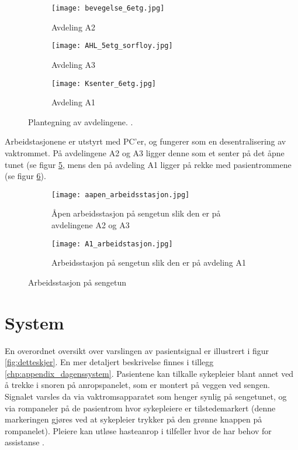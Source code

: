 \begin{figure}[H]
        \centering
        \begin{subfigure}[b]{1.0\textwidth}
        		\centering
				\texttt{[image: bevegelse\_6etg.jpg]}
				\caption{Avdeling A2}
				\label{fig:Bevegelse}
        \end{subfigure}
        
        \begin{subfigure}[b]{1.0\textwidth}
        		\centering
				\texttt{[image: AHL\_5etg\_sorfloy.jpg]}
				\caption{Avdeling A3}
				\label{fig:AHL}
        \end{subfigure}
        
        \begin{subfigure}[b]{1.0\textwidth}
        		\centering
				\texttt{[image: Ksenter\_6etg.jpg]}
				\caption{Avdeling A1}
				\label{fig:Ksenter}		
        \end{subfigure}
        \caption{Plantegning av avdelingene. \citep{sykehuskart}.}
        \label{Plantegninger}
\end{figure}

\noindent
Arbeidstasjonene er utstyrt med PC'er, og fungerer som en desentralisering av vaktrommet. På avdelingene A2 og A3 ligger denne som et senter på det åpne tunet (se figur \ref{fig:aapen_arbeidsstasjon}, mens den på avdeling A1 ligger på rekke med pasientrommene (se figur \ref{fig:A1_arbeidsstasjon}).

\begin{figure}[H]
\centering
	\begin{subfigure}[b]{1.0\textwidth}
		\centering
		\texttt{[image: aapen\_arbeidsstasjon.jpg]}
		\caption{Åpen arbeidsstasjon på sengetun slik den er på avdelingene A2 og A3 			\citep{sykehuskart}}
		\label{fig:aapen_arbeidsstasjon}
	\end{subfigure}
	
	\begin{subfigure}[b]{1.0\textwidth}
		\centering
		\texttt{[image: A1\_arbeidstasjon.jpg]}
		\caption{Arbeidsstasjon på sengetun slik den er på avdeling A1 							\citep{sykehuskart}}
		\label{fig:A1_arbeidsstasjon}
	\end{subfigure}
\caption{Arbeidsstasjon på sengetun}
\label{fig:arbeidsstasjon}
\end{figure}


\section{System}
En overordnet oversikt over varslingen av pasientsignal er illustrert i figur \ref{fig:detteskjer}. En mer detaljert beskrivelse finnes i tillegg \ref{chp:appendix_dagenssystem}.
Pasientene kan tilkalle sykepleier blant annet ved å trekke i snoren på anropspanelet, som er montert på veggen ved sengen. Signalet varsles da via vaktromsapparatet som henger synlig på sengetunet, og via rompaneler på de pasientrom hvor sykepleiere er tilstedemarkert (denne markeringen gjøres ved at sykepleier trykker på den grønne knappen på rompanelet). Pleiere kan utløse hasteanrop i tilfeller hvor de har behov for assistanse \citep{BrukerveiledningforPasientsignal}.


